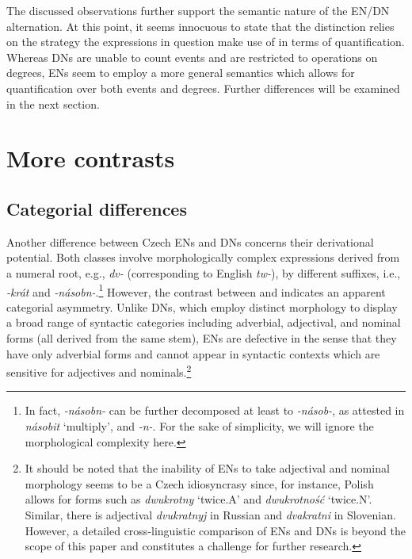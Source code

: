 \documentclass[output=paper,
modfonts,
hidelinks,
newtxmath
]{langscibook}
\begin{document}
\noindent The discussed observations further support the semantic nature of the EN/DN alternation. At this point, it seems innocuous to state that the distinction relies on the strategy the expressions in question make use of in terms of quantification. Whereas DNs are unable to count events and are restricted to operations on degrees, ENs seem to employ a more general semantics which allows for quantification over both events and degrees. Further differences will be examined in the next section.

\section{More contrasts}\label{more-contrasts}

\subsection{Categorial differences}\label{categorial-differences}

Another difference between Czech ENs and DNs concerns their derivational potential. Both classes involve morphologically complex expressions derived from a numeral root, e.g., \textit{dv-} (corresponding to English \textit{tw-}), by different suffixes, i.e., \textit{-krát} and \textit{-násobn-}.\footnote{In fact, \textit{-násobn-} can be further decomposed at least to \textit{-násob-}, as attested in \textit{násobit} `multiply', and \textit{-n-}. For the sake of simplicity, we will ignore the morphological complexity here.} However, the contrast between  and  indicates an apparent categorial asymmetry. Unlike DNs, which employ distinct morphology to display a broad range of syntactic categories including adverbial, adjectival, and nominal forms (all derived from the same stem), ENs are defective in the sense that they have only adverbial forms and cannot appear in syntactic contexts which are sensitive for adjectives and nominals.\footnote{It should be noted that the inability of ENs to take adjectival and nominal morphology seems to be a Czech idiosyncrasy since, for instance, Polish allows for forms such as \textit{dwukrotny} `twice.A' and \textit{dwukrotność} `twice.N'. Similar, there is adjectival \textit{dvukratnyj} in Russian and \textit{dvakratni} in Slovenian. However, a detailed cross-linguistic comparison of ENs and DNs is beyond the scope of this paper and constitutes a challenge for further research.}
\end{document}
